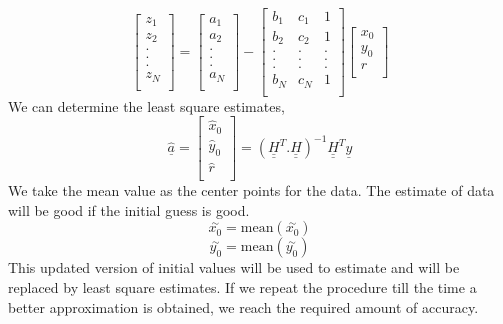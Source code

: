 \[
\begin{bmatrix}
z_1\\
z_2\\
.\\
.\\
.\\
z_N\\
\end{bmatrix}
=
\begin{bmatrix}
a_1\\
a_2\\
.\\
.\\
.\\
a_N\\
\end{bmatrix}
-
\begin{bmatrix}
b_1 & c_1 & 1\\
b_2 & c_2 & 1\\
. & . & .\\
. & . & .\\
. & . & .\\
b_N & c_N & 1\\
\end{bmatrix}
\begin{bmatrix}
x_0\\
y_0\\
r\\
\end{bmatrix}
\]
\noindent We can determine the least square estimates,
$$\hat{\underline{a}}=
\begin{bmatrix}
\hat{x}_0\\
\hat{y}_0\\
\hat{r}\\
\end{bmatrix}
=
(\underline{\underline{H}}^T.\underline{\underline{H}})^{-1}\underline{\underline{H}}^T\underline{y}$$
\noindent We take the mean value as the center points for the data. The estimate of data will be good if the initial guess is good.
$$\overset{\sim}{x_0} = \text{mean}(\overset{\sim}{x_0}) $$
$$\overset{\sim}{y_0} = \text{mean}(\overset{\sim}{y_0}) $$
\noindent This updated version of initial values will be used to estimate and will be replaced by least square estimates. If we repeat the procedure till the time a better approximation is obtained, we reach the required amount of accuracy.

